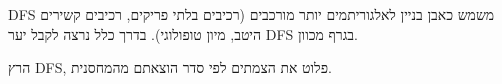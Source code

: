 DFS
משמש כאבן בניין לאלגוריתמים יותר מורכבים (רכיבים בלתי פריקים, רכיבים קשירים היטב, מיון טופולוגי).
בדרך כלל נרצה לקבל יער DFS בגרף מכוון.
\begin{example}
הרץ DFS, פלוט את הצמתים לפי סדר הוצאתם מהמחסנית.
\end{example}

